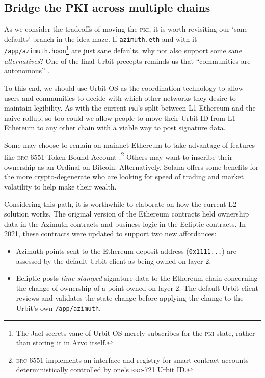 \documentclass[twoside]{article}
\begin{document}
\subsection[Bridge the \textsc{pki} across multiple chains]{Bridge the PKI across multiple chains}

\sloppy
As we consider the tradeoffs of moving the \textsc{pki}, it is worth revisiting our `sane defaults' branch in the idea maze. If \lstinline[style=inlinecode]{azimuth.eth} and with it \lstinline[style=inlinecode]{/app/azimuth.hoon}\footnote{The Jael secrets vane of Urbit OS merely subscribes for the \textsc{pki} state, rather than storing it in Arvo itself.} are just sane defaults, why not also support some sane \emph{alternatives}? One of the final Urbit precepts reminds us that ``communities are autonomous'' \citep{UrbitPrecepts}.

To this end, we should use Urbit OS as the coordination technology to allow users and communities to decide with which other networks they desire to maintain legibility. As with the current \textsc{pki}'s split between L1 Ethereum and the naive rollup, so too could we allow people to move their Urbit ID from L1 Ethereum to any other chain with a viable way to post signature data.

Some may choose to remain on mainnet Ethereum to take advantage of features like \textsc{erc}-6551 Token Bound Account \citep{EIP6551}.\footnote{\textsc{erc}-6551 implements an interface and registry for smart contract accounts deterministically controlled by one's \textsc{erc}-721 Urbit ID.} Others may want to inscribe their ownership as an Ordinal on Bitcoin. Alternatively, Solana offers some benefits for the more crypto-degenerate who are looking for speed of trading and market volatility to help make their wealth. 

Considering this path, it is worthwhile to elaborate on how the current L2 solution works. The original version of the Ethereum contracts held ownership data in the Azimuth contracts and business logic in the Ecliptic contracts. In 2021, these contracts were updated to support two new affordances:

\begin{itemize}
  \item  Azimuth points sent to the Ethereum deposit address (\lstinline[style=inlinecode]{0x1111...}) are assessed by the default Urbit client as being owned on layer 2.
  \item  Ecliptic posts \emph{time-stamped} signature data to the Ethereum chain concerning the change of ownership of a point owned on layer 2.  The default Urbit client reviews and validates the state change before applying the change to the Urbit's own \lstinline[style=inlinecode]{/app/azimuth}.
\end{itemize}
\end{document}
